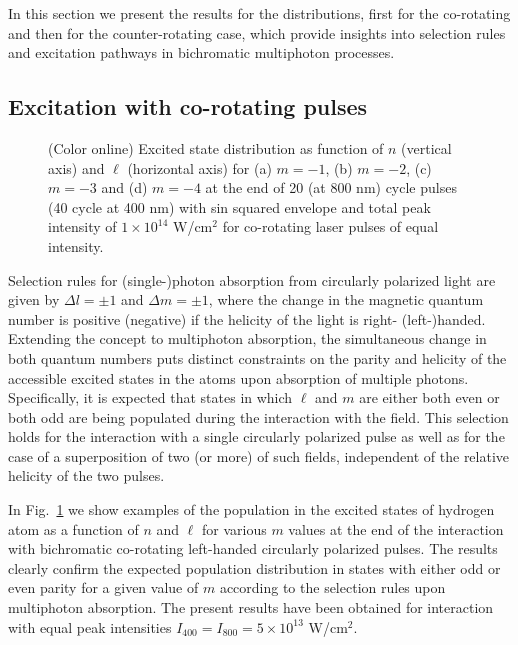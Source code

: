 In this section we present the results for the distributions, first for the co-rotating and then for the counter-rotating case, which provide insights into selection rules and excitation pathways in bichromatic multiphoton processes.

\subsection{Excitation with co-rotating pulses}

\begin{figure}[h!]
\caption{\label{fig:co-nl-distribution}
(Color online)
Excited state distribution as function of $n$ (vertical axis) and $\ell$ (horizontal axis) for (a) $m = -1$, (b) $m=-2$, (c) $m=-3$ and (d) $m=-4$ at the end of 20 (at 800 nm) cycle pulses (40 cycle at 400 nm) with sin squared envelope and total peak intensity of $1\times10^{14}$ W/cm$^2$ for co-rotating laser pulses of equal intensity. 
}
\end{figure}

Selection rules for (single-)photon absorption from circularly polarized light are given by $\Delta l = \pm 1$ and $\Delta m = \pm 1$, where the change in the magnetic quantum number is positive (negative) if the helicity of the light is right- (left-)handed. Extending the concept to multiphoton absorption, the simultaneous change in both quantum numbers puts distinct constraints on the parity and helicity of the accessible excited states in the atoms upon absorption of multiple photons. Specifically, it is expected that states in which $\ell$ and $m$ are either both even or both odd are being populated during the interaction with the field. This selection holds for the interaction with a single circularly polarized pulse as well as for the case of a superposition of two (or more) of such fields, independent of the relative helicity of the two pulses. 

In Fig.~\ref{fig:co-nl-distribution} we show examples of the population in the excited states of hydrogen atom as a function of $n$ and $\ell$ for various $m$ values at the end of the interaction with bichromatic co-rotating left-handed circularly polarized pulses. The results clearly confirm the expected population distribution in states with either odd or even parity for a given value of $m$ according to the selection rules upon multiphoton absorption. The present results have been obtained for interaction with equal peak intensities $I_{400} = I_{800} = 5\times 10^{13}$ W/cm$^2$. 

